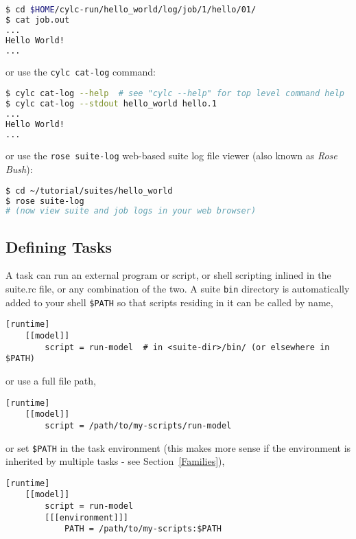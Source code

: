 \begin{shaded*}
\begin{lstlisting}[language=bash]
$ cd $HOME/cylc-run/hello_world/log/job/1/hello/01/
$ cat job.out
...
Hello World!
...
\end{lstlisting}

or use the \lstinline{cylc cat-log} command:

\begin{lstlisting}[language=bash]
$ cylc cat-log --help  # see "cylc --help" for top level command help
$ cylc cat-log --stdout hello_world hello.1
...
Hello World!
...
\end{lstlisting}

or use the \lstinline{rose suite-log} web-based suite log file viewer (also known as {\em Rose Bush}):

\begin{lstlisting}[language=bash]
$ cd ~/tutorial/suites/hello_world
$ rose suite-log
# (now view suite and job logs in your web browser)
\end{lstlisting}

\end{shaded*}

\subsection{Defining Tasks}

A task can run an external program or script, or shell scripting
inlined in the suite.rc file, or any combination of the two.  A suite
\lstinline{bin} directory is automatically added to your shell
\lstinline{$PATH} so that scripts residing in it can be called by name,

\begin{lstlisting}[language=suiterc]
[runtime]
    [[model]]
        script = run-model  # in <suite-dir>/bin/ (or elsewhere in $PATH)
\end{lstlisting}

or use a full file path,

\begin{lstlisting}[language=suiterc]
[runtime]
    [[model]]
        script = /path/to/my-scripts/run-model
\end{lstlisting}

or set \lstinline{$PATH} in the task environment (this makes more sense
if the environment is inherited by multiple tasks - see
Section~\ref{Families}),
\begin{lstlisting}[language=suiterc]
[runtime]
    [[model]]
        script = run-model
        [[[environment]]]
            PATH = /path/to/my-scripts:$PATH
\end{lstlisting}

